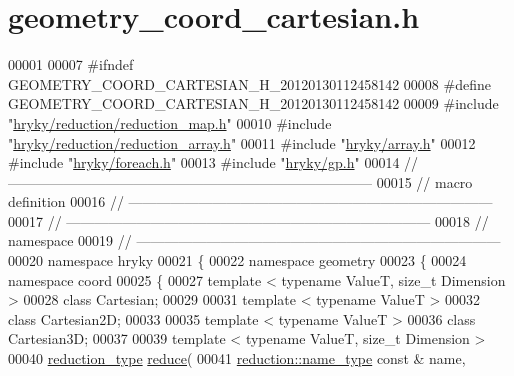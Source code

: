\hypertarget{geometry__coord__cartesian_8h_source}{\section{geometry\-\_\-coord\-\_\-cartesian.\-h}
}

\begin{DoxyCode}
00001 
00007 \textcolor{preprocessor}{#ifndef GEOMETRY\_COORD\_CARTESIAN\_H\_20120130112458142}
00008 \textcolor{preprocessor}{}\textcolor{preprocessor}{#define GEOMETRY\_COORD\_CARTESIAN\_H\_20120130112458142}
00009 \textcolor{preprocessor}{}\textcolor{preprocessor}{#include "\hyperlink{reduction__map_8h}{hryky/reduction/reduction_map.h}"}
00010 \textcolor{preprocessor}{#include "\hyperlink{reduction__array_8h}{hryky/reduction/reduction_array.h}"}
00011 \textcolor{preprocessor}{#include "\hyperlink{array_8h}{hryky/array.h}"}
00012 \textcolor{preprocessor}{#include "\hyperlink{foreach_8h}{hryky/foreach.h}"}
00013 \textcolor{preprocessor}{#include "\hyperlink{gp_8h}{hryky/gp.h}"}
00014 \textcolor{comment}{//
      ------------------------------------------------------------------------------}
00015 \textcolor{comment}{// macro definition}
00016 \textcolor{comment}{//
      ------------------------------------------------------------------------------}
00017 \textcolor{comment}{//
      ------------------------------------------------------------------------------}
00018 \textcolor{comment}{// namespace}
00019 \textcolor{comment}{//
      ------------------------------------------------------------------------------}
00020 \textcolor{keyword}{namespace }hryky
00021 \{
00022 \textcolor{keyword}{namespace }geometry
00023 \{
00024 \textcolor{keyword}{namespace }coord
00025 \{
00027     \textcolor{keyword}{template} < \textcolor{keyword}{typename} ValueT, \textcolor{keywordtype}{size\_t} Dimension >
00028     \textcolor{keyword}{class }Cartesian;
00029     
00031     \textcolor{keyword}{template} < \textcolor{keyword}{typename} ValueT >
00032     \textcolor{keyword}{class }Cartesian2D;
00033 
00035     \textcolor{keyword}{template} < \textcolor{keyword}{typename} ValueT >
00036     \textcolor{keyword}{class }Cartesian3D;
00037 
00039     \textcolor{keyword}{template} < \textcolor{keyword}{typename} ValueT, \textcolor{keywordtype}{size\_t} Dimension >
00040     \hyperlink{namespacehryky_a343a9a4c36a586be5c2693156200eadc}{reduction_type} \hyperlink{namespacehryky_1_1geometry_a18354ece30244aa68fc3744f2cdb41fc}{reduce}(
00041         \hyperlink{namespacehryky_1_1reduction_ac686c30a4c8d196bbd0f05629a6b921f}{reduction::name_type} \textcolor{keyword}{const} & name,

\end{DoxyCode}
